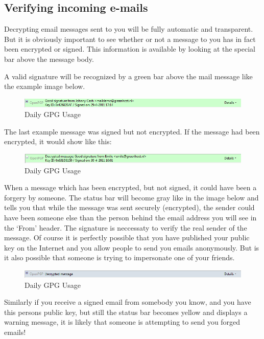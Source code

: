 \subsection{Verifying incoming e-mails}

Decrypting email messages sent to you will be fully automatic and
transparent. But it is obviously important to see whether or not a
message to you has in fact been encrypted or signed. This information is
available by looking at the special bar above the message body.

A valid signature will be recognized by a green bar above the mail
message like the example image below.

\begin{figure}[htbp]
\centering
\includegraphics{daily_gpg_30.png}
\caption{Daily GPG Usage}
\end{figure}

The last example message was signed but not encrypted. If the message
had been encrypted, it would show like this:

\begin{figure}[htbp]
\centering
\includegraphics{daily_gpg_31.png}
\caption{Daily GPG Usage}
\end{figure}

When a message which has been encrypted, but not signed, it could have
been a forgery by someone. The status bar will become gray like in the
image below and tells you that while the message was sent securely
(encrypted), the sender could have been someone else than the person
behind the email address you will see in the `From' header. The
signature is neccessaty to verify the real sender of the message. Of
course it is perfectly possible that you have published your public key
on the Internet and you allow people to send you emails anonymously. But
is it also possible that someone is trying to impersonate one of your
friends.

\begin{figure}[htbp]
\centering
\includegraphics{daily_gpg_32.png}
\caption{Daily GPG Usage}
\end{figure}

Similarly if you receive a signed email from somebody you know, and you
have this persons public key, but still the status bar becomes yellow
and displays a warning message, it is likely that someone is attempting
to send you forged emails!

